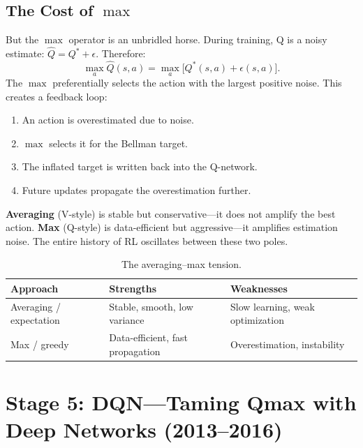 \subsection{The Cost of $\max$}

But the $\max$ operator is an unbridled horse.
During training, Q is a noisy estimate: $\hat{Q} = Q^{\ast} + \epsilon$.
Therefore:
\begin{equation}
\max_a \hat{Q}(s,a) = \max_a \bigl[Q^{\ast}(s,a) + \epsilon(s,a)\bigr].
\end{equation}
The $\max$ preferentially selects the action with the largest positive noise.
This creates a feedback loop:
\begin{enumerate}
    \item An action is overestimated due to noise.
    \item $\max$ selects it for the Bellman target.
    \item The inflated target is written back into the Q-network.
    \item Future updates propagate the overestimation further.
\end{enumerate}

\begin{keyidea}
\textbf{Averaging} (V-style) is stable but conservative---it does not amplify the best action.
\textbf{Max} (Q-style) is data-efficient but aggressive---it amplifies estimation noise.
The entire history of RL oscillates between these two poles.
\end{keyidea}

\begin{table}[ht]
\centering
\caption{The averaging--max tension.}
\label{tab:avg-vs-max}
\begin{tabular}{lll}
\toprule
\textbf{Approach} & \textbf{Strengths} & \textbf{Weaknesses} \\
\midrule
Averaging / expectation & Stable, smooth, low variance & Slow learning, weak optimization \\
Max / greedy & Data-efficient, fast propagation & Overestimation, instability \\
\bottomrule
\end{tabular}
\end{table}

\section{Stage 5: DQN---Taming Qmax with Deep Networks (2013--2016)}
\label{sec:stage5-dqn}


